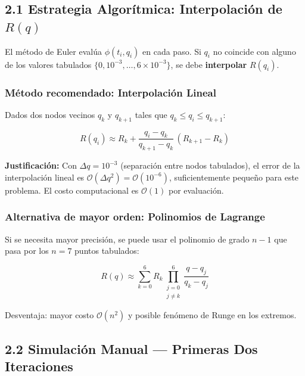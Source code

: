 \documentclass[12pt,a4paper]{article}
\begin{document}
\subsection{2.1 Estrategia Algorítmica: Interpolación de $R(q)$}

El método de Euler evalúa $\phi(t_i, q_i)$ en cada paso. Si $q_i$ no coincide
con alguno de los valores tabulados $\{0, 10^{-3}, \ldots, 6\times10^{-3}\}$,
se debe \textbf{interpolar} $R(q_i)$.

\subsubsection*{Método recomendado: Interpolación Lineal}

Dados dos nodos vecinos $q_k$ y $q_{k+1}$ tales que $q_k \leq q_i \leq q_{k+1}$:

\begin{equation}
    R(q_i) \approx R_k + \frac{q_i - q_k}{q_{k+1}-q_k}\,(R_{k+1} - R_k)
    \label{eq:interp}
\end{equation}

\noindent \textbf{Justificación:} Con $\Delta q = 10^{-3}$ (separación entre
nodos tabulados), el error de la interpolación lineal es
$\mathcal{O}(\Delta q^2) = \mathcal{O}(10^{-6})$, suficientemente pequeño para este problema.
El costo computacional es $\mathcal{O}(1)$ por evaluación.

\subsubsection*{Alternativa de mayor orden: Polinomios de Lagrange}

Si se necesita mayor precisión, se puede usar el polinomio de grado $n-1$
que pasa por los $n=7$ puntos tabulados:

\begin{equation}
    R(q) \approx \sum_{k=0}^{6} R_k \prod_{\substack{j=0\\j\neq k}}^{6}
    \frac{q - q_j}{q_k - q_j}
\end{equation}

Desventaja: mayor costo $\mathcal{O}(n^2)$ y posible fenómeno de Runge en los extremos.

\subsection{2.2 Simulación Manual --- Primeras Dos Iteraciones}
\end{document}

